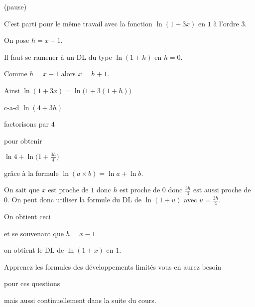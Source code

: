 (pause)

\change

C'est parti pour le même travail avec la fonction $\ln(1+3x)$ en $1$ à l'ordre $3$. 

\change

On pose $h=x-1$.

Il faut se ramener à un DL du type $\ln(1+h)$ en $h=0$.

\change

Comme $h=x-1$ alors $x=h+1$.

\change

Ainsi $\ln(1+3x) = \ln\big(1+3(1+h)\big)$

\change 

c-a-d 
$\ln(4 + 3h)$

\change

factorisons par $4$ 

\change

pour obtenir

$\ln 4 + \ln\big(1+\frac{3h}{4}\big)$

grâce à la formule $\ln(a\times b)=\ln a + \ln b$.


On sait que $x$ est proche de $1$ donc $h$ est proche de $0$
donc $\frac{3h}{4}$ est aussi proche de $0$.
On peut donc utiliser la formule du DL de $\ln (1+u)$ avec $u=\frac{3h}{4}$.

On obtient ceci

\change 

et se souvenant que $h=x-1$ 

\change

on obtient le DL de $\ln(1+x)$ en $1$.

\change



\diapo


Apprenez les formules des développements limités vous en aurez besoin

pour ces questions

mais aussi continuellement dans la suite du cours.
 
